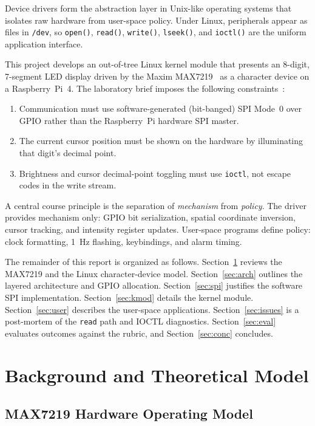 \documentclass[conference,a4paper]{IEEEtran}
\begin{document}
Device drivers form the abstraction layer in Unix-like operating systems that isolates raw hardware from user-space policy. Under Linux, peripherals appear as files in \texttt{/dev}, so \texttt{open()}, \texttt{read()}, \texttt{write()}, \texttt{lseek()}, and \texttt{ioctl()} are the uniform application interface.

This project develops an out-of-tree Linux kernel module that presents an 8-digit, 7-segment LED display driven by the Maxim MAX7219~\cite{max7219} as a character device on a Raspberry~Pi~4. The laboratory brief imposes the following constraints~\cite{acs2026}:
\begin{enumerate}
    \item Communication must use software-generated (bit-banged) SPI Mode~0 over GPIO rather than the Raspberry~Pi hardware SPI master.
    \item The current cursor position must be shown on the hardware by illuminating that digit's decimal point.
    \item Brightness and cursor decimal-point toggling must use \texttt{ioctl}, not escape codes in the write stream.
\end{enumerate}

A central course principle is the separation of \textit{mechanism} from \textit{policy}. The driver provides mechanism only: GPIO bit serialization, spatial coordinate inversion, cursor tracking, and intensity register updates. User-space programs define policy: clock formatting, 1~Hz flashing, keybindings, and alarm timing.

The remainder of this report is organized as follows. Section~\ref{sec:bg} reviews the MAX7219 and the Linux character-device model. Section~\ref{sec:arch} outlines the layered architecture and GPIO allocation. Section~\ref{sec:spi} justifies the software SPI implementation. Section~\ref{sec:kmod} details the kernel module. Section~\ref{sec:user} describes the user-space applications. Section~\ref{sec:issues} is a post-mortem of the \texttt{read} path and IOCTL diagnostics. Section~\ref{sec:eval} evaluates outcomes against the rubric, and Section~\ref{sec:conc} concludes.

\section{Background and Theoretical Model}
\label{sec:bg}

\subsection{MAX7219 Hardware Operating Model}
\end{document}
